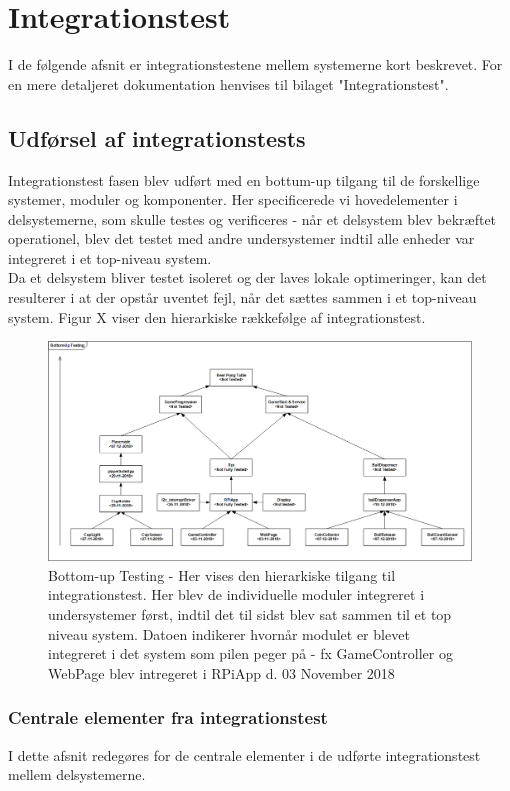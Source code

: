 \documentclass[Rapport/Rapport_main.tex]{subfiles}
\begin{document}
\section{Integrationstest}
I de følgende afsnit er integrationstestene mellem systemerne kort beskrevet. For en mere detaljeret dokumentation henvises til bilaget "Integrationstest". 

\subsection{Udførsel af integrationstests}
Integrationstest fasen blev udført med en bottum-up tilgang til de forskellige systemer, moduler og komponenter. Her specificerede vi hovedelementer i delsystemerne, som skulle testes og verificeres - når et delsystem blev bekræftet operationel, blev det testet med andre undersystemer indtil alle enheder var integreret i et top-niveau system. \\
Da et delsystem bliver testet isoleret og der laves lokale optimeringer, kan det resulterer i at der opstår uventet fejl, når det sættes sammen i et top-niveau system. Figur X viser den hierarkiske rækkefølge af integrationstest. 
\begin{figure}[H]
    \centering
    \includegraphics[width=1\textwidth]{Rapport/Test/graphics/Buttom-Up.png}
    \caption{Bottom-up Testing - Her vises den hierarkiske tilgang til integrationstest. Her blev de individuelle moduler integreret i undersystemer først, indtil det til sidst blev sat sammen til et top niveau system. Datoen indikerer hvornår modulet er blevet integreret i det system som pilen peger på - fx GameController og WebPage blev intregeret i RPiApp d. 03 November 2018}
   \label{fig:Bottom-Up}
\end{figure}

\subsubsection{Centrale elementer fra integrationstest}
I dette afsnit redegøres for de centrale elementer i de udførte integrationstest mellem delsystemerne. 
\end{document}

